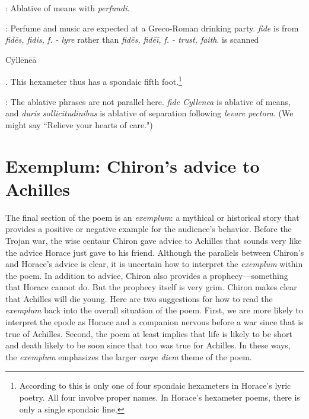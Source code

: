 
: Ablative of means with \textit{perfundi}.


: Perfume and music are expected at a Greco-Roman
drinking party.  \textit{fide} is from \textit{fidēs, fidis, f. - lyre} rather
than \textit{fidēs, fidēī, f. - trust, faith}.\indent{} is scanned
\begin{metrica}C\=yll\=en\=e\=a\end{metrica}.  This hexameter thus has a
spondaic fifth foot.\footnote{According to \citet[220]{mankin1995} this is only
one of four spondaic hexameters in Horace's lyric poetry.  All four involve
proper names.  In Horace's hexameter poems, there is only a single spondaic
line.}


: The ablative phrases are not parallel here.
\textit{fide Cyllenea} is ablative of means, and \textit{duris
sollicitudinibus} is ablative of separation following \textit{levare pectora}.
(We might say ``Relieve your hearts of care.")

\section*{Exemplum: Chiron's advice to Achilles}

The final section of the poem is an \textit{exemplum}: a mythical or historical
story that provides a positive or negative example for the audience's behavior.  Before the Trojan war, the wise centaur Chiron gave advice to Achilles that
sounds very like the advice Horace just gave to his friend.  Although the
parallels between Chiron's and Horace's advice is clear, it is uncertain how
to interpret the \textit{exemplum} within the poem.  In addition to advice,
Chiron also provides a prophecy---something that Horace cannot do.  But the
prophecy itself is very grim.  Chiron makes clear that Achilles will die
young.  Here are two suggestions for how to read the \textit{exemplum} back
into the overall situation of the poem.  First, we are more likely to interpret
the epode as Horace and a companion nervous before a war since that is true of
Achilles.  Second, the poem at least implies that life is likely to be short
and death likely to be soon since that too was true for Achilles.  In these
ways, the \textit{exemplum} emphasizes the larger \textit{carpe diem} theme of
the poem.

